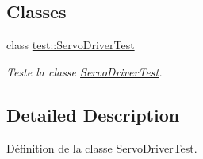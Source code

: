 \subsection*{Classes}
\begin{DoxyCompactItemize}
\item 
class \hyperlink{classtest_1_1ServoDriverTest}{test\+::\+Servo\+Driver\+Test}
\begin{DoxyCompactList}\small\item\em Teste la classe \hyperlink{classtest_1_1ServoDriverTest}{Servo\+Driver\+Test}. \end{DoxyCompactList}\end{DoxyCompactItemize}


\subsection{Detailed Description}
Définition de la classe Servo\+Driver\+Test. 

